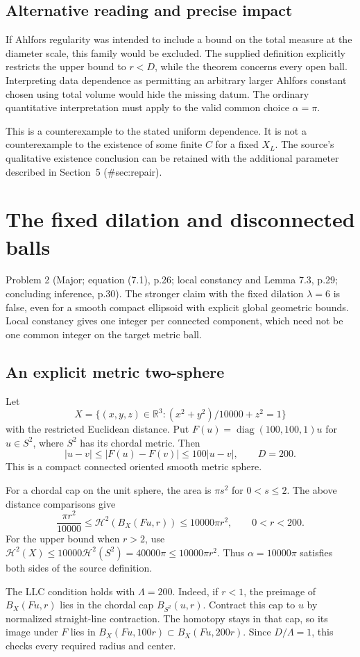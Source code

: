 \documentclass[10pt]{article}
\begin{document}
\subsection*{Alternative reading and precise impact}
If Ahlfors regularity was intended to include a bound on the total measure at the diameter scale, this family would be excluded. The supplied definition explicitly restricts the upper bound to \(r<D\), while the theorem concerns every open ball. Interpreting data dependence as permitting an arbitrary larger Ahlfors constant chosen using total volume would hide the missing datum. The ordinary quantitative interpretation must apply to the valid common choice \(\alpha=\pi\).\par
This is a counterexample to the stated uniform dependence. It is not a counterexample to the existence of some finite \(C\) for a fixed \(X_L\). The source’s qualitative existence conclusion can be retained with the additional parameter described in Section 5 (\#sec:repair).\par
\section*{The fixed dilation and disconnected balls}
Problem 2 (Major; equation (7.1), p.26; local constancy and Lemma 7.3, p.29; concluding inference, p.30).  The stronger claim with the fixed dilation \(\lambda=6\) is false, even for a smooth compact ellipsoid with explicit global geometric bounds. Local constancy gives one integer per connected component, which need not be one common integer on the target metric ball.\par
\subsection*{An explicit metric two-sphere}
Let \[X=\{(x,y,z)\in\mathbb R^3:(x^2+y^2)/10000+z^2=1\}\] with the restricted Euclidean distance. Put \(F(u)=\operatorname{diag}(100,100,1)u\) for \(u\in S^2\), where \(S^2\) has its chordal metric. Then \[|u-v|\le|F(u)-F(v)|\le100|u-v|,\qquad D=200.\] This is a compact connected oriented smooth metric sphere.\par
For a chordal cap on the unit sphere, the area is \(\pi s^2\) for \(0<s\le2\). The above distance comparisons give \[\frac{\pi r^2}{10000}\le\mathcal H^2(B_X(Fu,r))
       \le10000\pi r^2,\qquad 0<r<200.\] For the upper bound when \(r>2\), use \(\mathcal H^2(X)\le10000\mathcal H^2(S^2)=40000\pi\le10000\pi r^2\). Thus \(\alpha=10000\pi\) satisfies both sides of the source definition.\par
The LLC condition holds with \(\Lambda=200\). Indeed, if \(r<1\), the preimage of \(B_X(Fu,r)\) lies in the chordal cap \(B_{S^2}(u,r)\). Contract this cap to \(u\) by normalized straight-line contraction. The homotopy stays in that cap, so its image under \(F\) lies in \(B_X(Fu,100r)\subset B_X(Fu,200r)\). Since \(D/\Lambda=1\), this checks every required radius and center.\par
\end{document}
